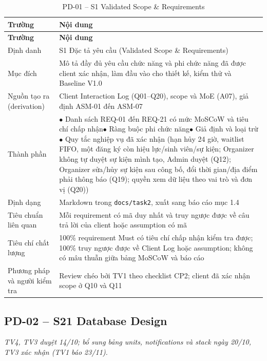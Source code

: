 \begingroup\tblsetup\tblzebra
\begin{longtable}{L{3.4cm}L{11.6cm}}
\caption{PD-01 -- S1 Validated Scope \& Requirements}\label{tab:pd-01}\\
\toprule
{}\textbf{Trường} & \textbf{Nội dung} \\
\midrule
\endfirsthead
\toprule
{}\textbf{Trường} & \textbf{Nội dung} \\
\midrule
\endhead
\bottomrule
\endlastfoot
Định danh & S1 Đặc tả yêu cầu (Validated Scope \& Requirements) \\
Mục đích & Mô tả đầy đủ yêu cầu chức năng và phi chức năng đã được client xác nhận, làm đầu vào cho thiết kế, kiểm thử và Baseline V1.0 \\
Nguồn tạo ra (derivation) & Client Interaction Log (Q01–Q20), scope và MoE (A07), giả định ASM-01 đến ASM-07 \\
Thành phần & $\bullet$ Danh sách REQ-01 đến REQ-21 có mức MoSCoW và tiêu chí chấp nhận\newline $\bullet$ Ràng buộc phi chức năng\newline $\bullet$ Giả định và loại trừ\newline $\bullet$ Quy tắc nghiệp vụ đã xác nhận (hạn hủy 24 giờ, waitlist FIFO, một đăng ký còn hiệu lực/sinh viên/sự kiện; Organizer không tự duyệt sự kiện mình tạo, Admin duyệt (Q12); Organizer sửa/hủy sự kiện sau công bố, đổi thời gian/địa điểm phải thông báo (Q19); quyền xem dữ liệu theo vai trò và đơn vị (Q20)) \\
Định dạng & Markdown trong \texttt{docs/task2}, xuất sang báo cáo mục 1.4 \\
Tiêu chuẩn liên quan & Mỗi requirement có mã duy nhất và truy ngược được về câu trả lời của client hoặc assumption có mã \\
Tiêu chí chất lượng & 100\% requirement Must có tiêu chí chấp nhận kiểm tra được; 100\% truy ngược được về Client Log hoặc assumption; không có mâu thuẫn giữa bảng MoSCoW và báo cáo \\
Phương pháp và người kiểm tra & Review chéo bởi TV1 theo checklist CP2; client đã xác nhận scope ở Q10 và Q11 \\
\end{longtable}
\endgroup

\subsection*{PD-02 -- S21 Database Design}
\noindent\textit{TV4, TV3 duyệt 14/10; bổ sung bảng units, notifications và stack ngày 20/10, TV3 xác nhận (TV1 báo 23/11).}

